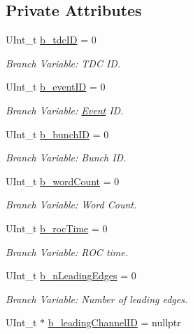 \subsection*{Private Attributes}
\begin{DoxyCompactItemize}
\item 
U\+Int\+\_\+t \hyperlink{class_packet_tree_manager_a5a07d44397bd25e8fc1e9db65f472d1a}{b\+\_\+tdc\+ID} = 0
\begin{DoxyCompactList}\small\item\em Branch Variable\+: T\+DC ID. \end{DoxyCompactList}\item 
U\+Int\+\_\+t \hyperlink{class_packet_tree_manager_a854d865fd2916a85e22560fee8a5c592}{b\+\_\+event\+ID} = 0
\begin{DoxyCompactList}\small\item\em Branch Variable\+: \hyperlink{class_event}{Event} ID. \end{DoxyCompactList}\item 
U\+Int\+\_\+t \hyperlink{class_packet_tree_manager_a3f7da74c8d3e4f3323c7ffdb8b845c45}{b\+\_\+bunch\+ID} = 0
\begin{DoxyCompactList}\small\item\em Branch Variable\+: Bunch ID. \end{DoxyCompactList}\item 
U\+Int\+\_\+t \hyperlink{class_packet_tree_manager_ad7d8e0343e3e5f949dc20e591b2e6b2b}{b\+\_\+word\+Count} = 0
\begin{DoxyCompactList}\small\item\em Branch Variable\+: Word Count. \end{DoxyCompactList}\item 
U\+Int\+\_\+t \hyperlink{class_packet_tree_manager_a710e3e4d48e842b512720774ab05e83a}{b\+\_\+roc\+Time} = 0
\begin{DoxyCompactList}\small\item\em Branch Variable\+: R\+OC time. \end{DoxyCompactList}\item 
U\+Int\+\_\+t \hyperlink{class_packet_tree_manager_a146354471ea64dae67959dd833c100c2}{b\+\_\+n\+Leading\+Edges} = 0
\begin{DoxyCompactList}\small\item\em Branch Variable\+: Number of leading edges. \end{DoxyCompactList}\item 
U\+Int\+\_\+t $\ast$ \hyperlink{class_packet_tree_manager_a14090e7e05b84788ac03b36843edb926}{b\+\_\+leading\+Channel\+ID} = nullptr

\end{DoxyCompactItemize}
